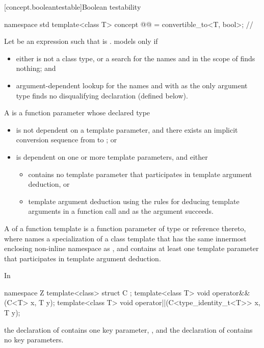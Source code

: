 [concept.booleantestable]{Boolean testability}

\begin{codeblock}
namespace std {
  template<class T>
  concept @@ = convertible_to<T, bool>; // \expos
}
\end{codeblock}

\pnum
Let  be an expression such that  is .  models  only if
\begin{itemize}
\item either  is not a class type, or a search for the names  and  in the scope of  finds nothing; and
\item argument-dependent lookup for the names  and  with  as the only argument type finds no disqualifying declaration (defined below).
\end{itemize}

\pnum
A  is a function parameter whose declared type 
\begin{itemize}
\item is not dependent on a template parameter, and there exists an implicit conversion sequence from  to ; or
\item is dependent on one or more template parameters, and either
\begin{itemize}
\item {} contains no template parameter that participates in template argument deduction, or
\item template argument deduction using the rules for deducing template arguments in a function call and  as the argument succeeds.
\end{itemize}
\end{itemize}

\pnum
A  of a function template  is a function parameter of type \cv{}  or reference thereto, where  names a specialization of a class template that has the same innermost enclosing non-inline namespace as , and  contains at least one template parameter that participates in template argument deduction.
\begin{example}
In

\begin{codeblock}
namespace Z {
  template<class> struct C {};
  template<class T>
    void operator&&(C<T> x, T y);
  template<class T>
    void operator||(C<type_identity_t<T>> x, T y);
}
\end{codeblock}

the declaration of  contains one key parameter, , and the declaration of  contains no key parameters.
\end{example}

